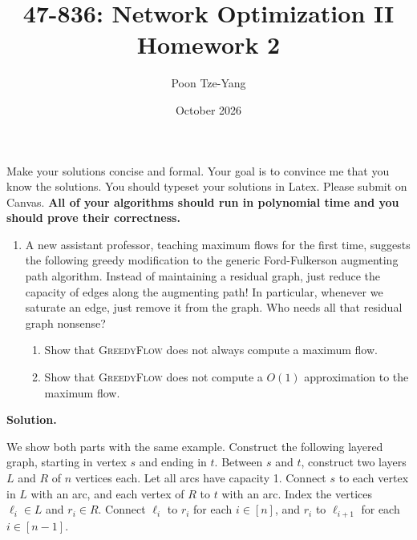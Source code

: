\documentclass[11pt,letterpaper]{article}
\title{47-836: Network Optimization II \\ Homework 2}
\author{Poon Tze-Yang}
\date{October 2026}
\theoremstyle{definition}
\newcommand{\solution}{\medskip\noindent\textbf{Solution.}\par\medskip}
\begin{document}
\maketitle

Make your solutions concise and formal. Your goal is to convince me that you know the solutions. You should typeset your solutions in Latex. Please submit on Canvas. \textbf{All of your algorithms should run in polynomial time and you should prove their correctness.}

\begin{enumerate}[series=q]
\item A new assistant professor, teaching maximum flows for the first time, suggests the following greedy modification to the generic Ford-Fulkerson augmenting path algorithm. Instead of maintaining a residual graph, just reduce the capacity of edges along the augmenting path! In particular, whenever we saturate an edge, just remove it from the graph. Who needs all that residual graph nonsense?

\begin{center}
\end{center}

\begin{enumerate}
\item Show that \textsc{GreedyFlow} does not always compute a maximum flow.
\item Show that \textsc{GreedyFlow} does not compute a $O(1)$ approximation to the maximum flow.
\end{enumerate}
\end{enumerate}

\solution
We show both parts with the same example.
Construct the following layered graph, starting in vertex $s$ and ending in $t$.
Between $s$ and $t$, construct two layers $L$ and $R$ of $n$ vertices each. 
Let all arcs have capacity 1.
Connect $s$ to each vertex in $L$ with an arc, and each vertex of $R$ to $t$ with an arc.
Index the vertices $\ell_i\in L$ and $r_i\in R$.
Connect $\ell_i$ to $r_i$ for each $i\in [n]$, and $r_i$ to $\ell_{i+1}$ for each $i\in [n-1]$.
\end{document}
